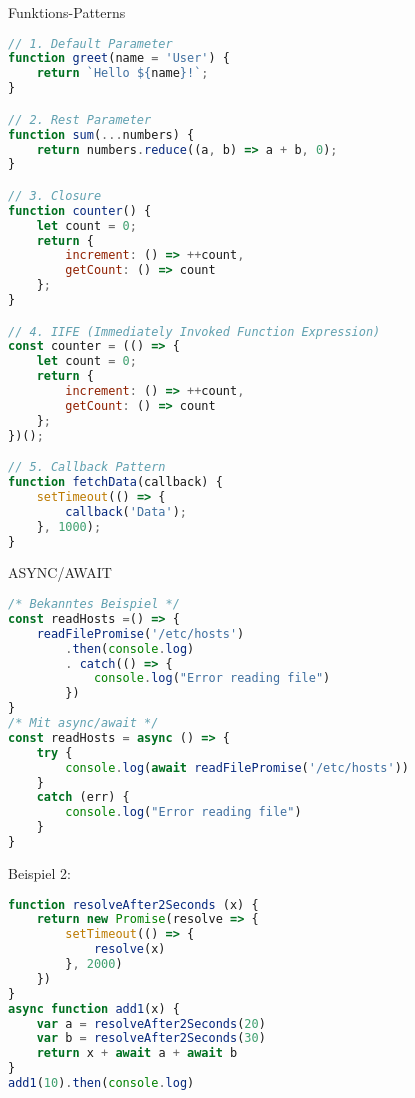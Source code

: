 \begin{KR}{Funktions-Patterns}
\begin{lstlisting}[language=JavaScript, style=basesmol]
// 1. Default Parameter
function greet(name = 'User') {
    return `Hello ${name}!`;
}

// 2. Rest Parameter
function sum(...numbers) {
    return numbers.reduce((a, b) => a + b, 0);
}

// 3. Closure
function counter() {
    let count = 0;
    return {
        increment: () => ++count,
        getCount: () => count
    };
}

// 4. IIFE (Immediately Invoked Function Expression)
const counter = (() => {
    let count = 0;
    return {
        increment: () => ++count,
        getCount: () => count
    };
})();

// 5. Callback Pattern
function fetchData(callback) {
    setTimeout(() => {
        callback('Data');
    }, 1000);
}
\end{lstlisting}
\end{KR}

\begin{code}{ASYNC/AWAIT}
\begin{lstlisting}[language=JavaScript, style=basesmol]
/* Bekanntes Beispiel */
const readHosts =() => {
    readFilePromise('/etc/hosts')
        .then(console.log)
        . catch(() => {
            console.log("Error reading file")
        })
}
/* Mit async/await */
const readHosts = async () => {
    try {
        console.log(await readFilePromise('/etc/hosts'))
    }
    catch (err) {
        console.log("Error reading file")
    }
}
\end{lstlisting}
Beispiel 2:
\begin{lstlisting}[language=JavaScript, style=basesmol]
function resolveAfter2Seconds (x) {
    return new Promise(resolve => {
        setTimeout(() => {
            resolve(x)
        }, 2000)
    })
}
async function add1(x) {
    var a = resolveAfter2Seconds(20)
    var b = resolveAfter2Seconds(30)
    return x + await a + await b
}
add1(10).then(console.log)
\end{lstlisting}
\end{code}